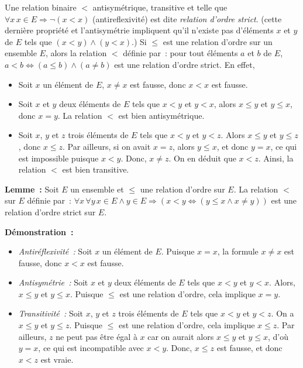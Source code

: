 Une relation binaire $<$ antisymétrique, transitive et telle que $\forall x \, x \in E \Rightarrow \neg (x < x)$ (antireflexivité) est dite \textit{relation d'ordre strict}. 
(cette dernière propriété et l'antisymétrie impliquent qu'il n'existe pas d'éléments $x$ et $y$ de $E$ tels que $(x < y) \wedge (y < x)$.)
Si $\leq$ est une relation d'ordre sur un ensemble $E$, alors la relation $<$ définie par : pour tout éléments $a$ et $b$ de $E$, $a < b \Leftrightarrow (a \leq b) \wedge (a \neq b)$ est une relation d'ordre strict.
En effet, 
\begin{itemize}[nosep]
    \item Soit $x$ un élément de $E$, $x \neq x$ est fausse, donc $x < x$ est fausse. 
    \item Soit $x$ et $y$ deux éléments de $E$ tels que $x < y$ et $y < x$, alors $x \leq y$ et $y \leq x$, donc $x = y$. 
        La relation $<$ est bien antisymétrique. 
    \item Soit $x$, $y$ et $z$ trois éléments de $E$ tels que $x < y$ et $y < z$. 
        Alors $x \leq y$ et $y \leq z$, donc $x \leq z$. 
        Par ailleurs, si on avait $x=z$, alors $y \leq x$, et donc $y = x$, ce qui est impossible puisque $x < y$. 
        Donc, $x \neq z$. 
        On en déduit que $x < z$. 
        Ainsi, la relation $<$ est bien transitive.
\end{itemize}

\medskip

\noindent\textbf{Lemme :} Soit $E$ un ensemble et $\leq$ une relation d'ordre sur $E$. 
    La relation $<$ sur $E$ définie par : $\forall x \, \forall y \, x \in E \wedge y \in E \Rightarrow (x < y \Leftrightarrow (y \leq x \wedge x \neq y))$ est une relation d'ordre strict sur $E$. 

\medskip

\noindent\textbf{Démonstration :} 
\begin{itemize}[nosep]
    \item \textit{Antiréflexivité :} Soit $x$ un élément de $E$. 
        Puisque $x = x$, la formule $x \neq x$ est fausse, donc $x < x$ est fausse.
    \item \textit{Antisymétrie :} Soit $x$ et $y$ deux éléments de $E$ tels que $x < y$ et $y < x$. 
        Alors, $x \leq y$ et $y \leq x$. 
        Puisque $\leq$ est une relation d'ordre, cela implique $x = y$.
    \item \textit{Transitivité :} Soit $x$, $y$ et $z$ trois éléments de $E$ tels que $x < y$ et $y < z$. 
        On a $x \leq y$ et $y \leq z$. 
        Puisque $\leq$ est une relation d'ordre, cela implique $x \leq z$. 
        Par ailleurs, $z$ ne peut pas être égal à $x$ car on aurait alors $x \leq y$ et $y \leq x$, d'où $y = x$, ce qui est incompatible avec $x < y$. 
        Donc, $x \leq z$ est fausse, et donc $x < z$ est vraie.
\end{itemize}

